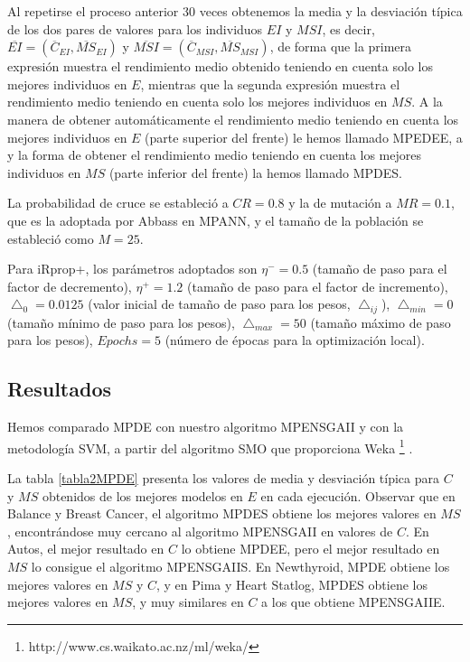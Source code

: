 Al repetirse el proceso anterior 30 veces obtenemos la media y la desviación
típica de los dos pares de valores para los individuos $EI$ y $MSI$, es decir,
$\displaystyle \overline{EI}=(\overline{C}_{EI},\overline{MS}_{EI})$ y
$\displaystyle \overline{MSI}=(\overline{C}_{MSI},\overline{MS}_{MSI})$, de forma que la
primera expresión muestra el rendimiento medio obtenido teniendo en cuenta solo los
mejores individuos en $E$, mientras que la segunda expresión muestra el rendimiento
medio teniendo en cuenta solo los mejores individuos en $MS$. A la manera
de obtener automáticamente el rendimiento medio teniendo en cuenta los mejores individuos
en $E$ (parte superior del frente) le hemos llamado MPEDEE, a y la forma de obtener el
rendimiento medio teniendo en cuenta los mejores individuos en $MS$ (parte inferior del
frente) la hemos llamado MPDES.

La probabilidad de cruce se estableció a $CR=0.8$ y la de mutación a $MR=0.1$, que es la
adoptada por Abbass en MPANN, y el tamaño de la población se estableció como $M=25$.

Para iRprop+, los parámetros adoptados son $\eta^{-}=0.5$ (tamaño de paso para el factor
de decremento), $\eta^{+}=1.2$ (tamaño de paso para el factor de incremento),
$\bigtriangleup_{0} =0.0125$ (valor inicial de tamaño de paso para los pesos,
$\bigtriangleup_{ij}$),  $\bigtriangleup_{min} =0$ (tamaño
mínimo de paso para los pesos), $\bigtriangleup_{max} =50$ (tamaño máximo de paso
para los pesos), $Epochs=5$ (número de épocas para la optimización local).

\subsection{Resultados}
\noindent Hemos comparado MPDE con nuestro algoritmo MPENSGAII y con la metodología SVM, a
partir del algoritmo SMO que proporciona Weka \footnote{http://www.cs.waikato.ac.nz/ml/weka/}
\cite{Witten2005}.

La tabla \ref{tabla2MPDE} presenta los valores de media y desviación típica para $C$ y
$MS$ obtenidos de los mejores modelos en $E$ en cada ejecución. Observar que en Balance y
Breast Cancer, el algoritmo MPDES obtiene los mejores valores en $MS$, encontrándose muy
cercano al algoritmo MPENSGAII en valores de $C$. En Autos, el mejor resultado en $C$ lo
obtiene MPDEE, pero el mejor resultado en $MS$ lo consigue el algoritmo MPENSGAIIS. En Newthyroid,
MPDE obtiene los mejores valores en $MS$ y $C$, y en Pima y Heart Statlog, MPDES obtiene
los mejores valores en $MS$, y muy similares en $C$ a los que obtiene MPENSGAIIE.


